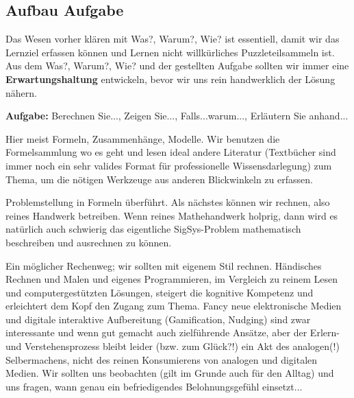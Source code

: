 \subsection*{Aufbau Aufgabe}
\begin{Ziel}
Das Wesen vorher klären mit Was?, Warum?, Wie? ist essentiell, damit wir das
Lernziel erfassen können und Lernen nicht willkürliches Puzzleteilsammeln ist.
Aus dem Was?, Warum?, Wie? und der gestellten Aufgabe sollten wir immer eine
\textbf{Erwartungshaltung} entwickeln, bevor wir uns rein handwerklich der Lösung nähern.
\end{Ziel}
\textbf{Aufgabe:} Berechnen Sie..., Zeigen Sie..., Falls...warum..., Erläutern
Sie anhand...
\begin{Werkzeug}
Hier meist Formeln, Zusammenhänge, Modelle. Wir benutzen die Formelsammlung
wo es geht und lesen ideal andere Literatur (Textbücher sind immer noch ein sehr
valides Format für professionelle Wissensdarlegung) zum Thema, um die nötigen
Werkzeuge aus anderen Blickwinkeln zu erfassen.
\end{Werkzeug}
\begin{Ansatz}
Problemstellung in Formeln überführt. Als nächstes können wir rechnen, also
reines Handwerk betreiben. Wenn reines Mathehandwerk holprig, dann wird es natürlich auch schwierig das eigentliche SigSys-Problem mathematisch beschreiben und ausrechnen zu können.
\end{Ansatz}
\begin{ExCalc}
Ein möglicher Rechenweg; wir sollten mit eigenem Stil
rechnen.
Händisches Rechnen und Malen und eigenes Programmieren, im Vergleich zu reinem
Lesen und computergestützten Lösungen, steigert die kognitive Kompetenz und
erleichtert dem Kopf den Zugang zum Thema.
%
Fancy neue elektronische Medien und digitale interaktive Aufbereitung (Gamification, Nudging) sind zwar interessante und wenn gut gemacht auch zielführende Ansätze,
aber der Erlern- und Verstehensprozess bleibt leider (bzw. zum Glück?!) ein
Akt des analogen(!) Selbermachens, nicht des reinen Konsumierens von analogen und digitalen Medien.
%
Wir sollten uns beobachten (gilt im Grunde auch für den Alltag) und uns fragen, wann genau ein
befriedigendes Belohnungsgefühl einsetzt...
%
\end{ExCalc}
